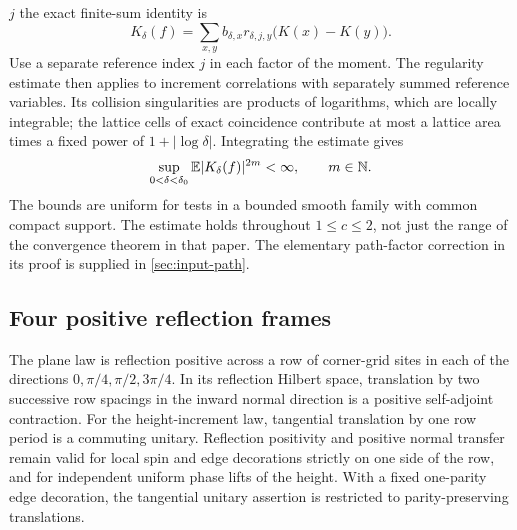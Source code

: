 $j$ the exact finite-sum identity is
\[
 K_\delta(f)
   =\sum_{x,y}b_{\delta,x}r_{\delta,j,y}\bigl(K(x)-K(y)\bigr).
\]
Use a separate reference index $j$ in each factor of the moment. The
regularity estimate \cite[Theorem~4.5]{DKLM2026} then applies to increment
correlations with separately summed reference variables. Its collision
singularities are products of logarithms, which are locally integrable;
the lattice cells of exact coincidence contribute at most a lattice area
times a fixed power of $1+|\log\delta|$. Integrating the estimate gives
\begin{equation}
 \sup_{0<\delta<\delta_0}\mathbb E|K_\delta(f)|^{2m}<\infty,
 \qquad m\in\mathbb N.
 \label{eq:plane-neutral-moments}
\end{equation}
The bounds are uniform for tests in a bounded smooth family with common
compact support. The estimate holds throughout $1\le c\le2$, not just the
range of the convergence theorem in that paper.
The elementary path-factor correction in its proof is supplied in
\cref{sec:input-path}.

\subsection{Four positive reflection frames}

\begin{lemma}
\label{lem:positive-transfer}
The plane law is reflection positive across a row of corner-grid sites in
each of the directions $0,\pi/4,\pi/2,3\pi/4$. In its reflection Hilbert
space, translation by two successive row spacings in the inward normal
direction is a positive self-adjoint contraction. For the height-increment
law, tangential translation by one row period is a commuting unitary.
Reflection positivity and positive normal transfer remain valid for local
spin and edge decorations strictly on one side of the row, and for
independent uniform phase lifts of the height. With a fixed one-parity edge
decoration, the tangential unitary assertion is restricted to
parity-preserving translations.
\end{lemma}

